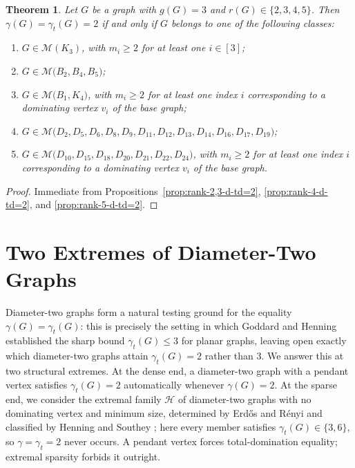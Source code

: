 \documentclass[12pt]{amsart}
\theoremstyle{plain}
\newtheorem{theorem}{Theorem}[section]
\theoremstyle{definition}
\begin{document}
\begin{theorem}\label{thm:girth-3-rank-2-5}
Let $G$ be a graph with $g(G)=3$ and $r(G)\in\{2,3,4,5\}$. Then $\gamma(G)=\gamma_t(G)=2$ if and only if $G$ belongs to one of the following classes:
\begin{enumerate}
\item[\textup{(i)}] $G\in\mathcal{M}(K_3)$, with $m_i\geq 2$ for at least one $i\in[3]$;

\item[\textup{(ii)}] $G\in\mathcal{M}\bigl(B_2,B_4,B_5\bigr)$;

\item[\textup{(iii)}] $G\in\mathcal{M}\bigl(B_1,K_4\bigr)$, with $m_i\geq 2$ for at least one index $i$ corresponding to a dominating vertex $v_i$ of the base graph;

\item[\textup{(iv)}] $G\in\mathcal{M}\bigl(D_2,D_5,D_6,D_8,D_9,D_{11},D_{12},D_{13},D_{14},D_{16},D_{17},D_{19}\bigr)$;

\item[\textup{(v)}] $G\in\mathcal{M}\bigl(D_{10},D_{15},D_{18},D_{20},D_{21},D_{22},D_{24}\bigr)$, with $m_i\geq 2$ for at least one index $i$ corresponding to a dominating vertex $v_i$ of the base graph.
\end{enumerate}

\end{theorem}

\begin{proof}
Immediate from Propositions~\ref{prop:rank-2,3-d-td=2}, \ref{prop:rank-4-d-td=2}, and \ref{prop:rank-5-d-td=2}.
\end{proof}



\section{Two Extremes of Diameter-Two Graphs}



Diameter-two graphs form a natural testing ground for the equality $\gamma(G)=\gamma_t(G)$: this is precisely the setting in which Goddard and Henning \cite{GoddardHenning2002} established the sharp bound $\gamma_t(G)\le 3$ for planar graphs, leaving open exactly which diameter-two graphs attain $\gamma_t(G)=2$ rather than $3$. We answer this at two structural extremes. At the dense end, a diameter-two graph with a pendant vertex satisfies $\gamma_t(G)=2$ automatically whenever $\gamma(G)=2$. At the sparse end, we consider the extremal family $\mathcal{H}$ of diameter-two graphs with no dominating vertex and minimum size, determined by Erd\H{o}s and R\'enyi \cite{ERDOS-RENYEL} and classified by Henning and Southey \cite{Henning-Michael}; here every member satisfies $\gamma_t(G)\in\{3,6\}$, so $\gamma=\gamma_t=2$ never occurs. A pendant vertex forces total-domination equality; extremal sparsity forbids it outright.
\end{document}
